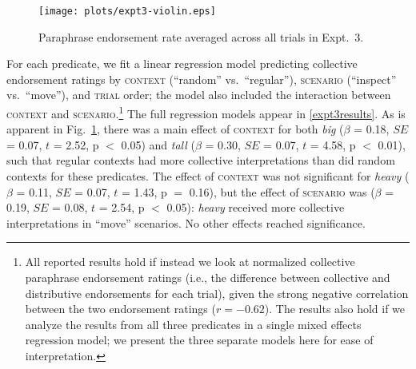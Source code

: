 \documentclass[preprint,12pt,authoryear,titlepage]{elsarticle}
\newcommand{\ndg}[1]{\textcolor{Green}{[ndg: #1]}}
\begin{document}

\begin{figure}[h!]
	\centering
	\texttt{[image: plots/expt3-violin.eps]} 
	\vspace{-20pt}
	\caption{Paraphrase endorsement rate averaged across all trials in Expt.~3.}\label{resultsexpt2}
\end{figure}

For each predicate, we fit a linear regression model predicting collective endorsement ratings by \textsc{context} (``random'' vs.~``regular''),
\textsc{scenario} (``inspect'' vs.~``move''), and \textsc{trial} order; the model also included the interaction between \textsc{context} and \textsc{scenario}.\footnote{All reported results hold if instead we look at normalized collective paraphrase endorsement ratings (i.e., the difference between collective and distributive endorsements for each trial), given the strong negative correlation between the two endorsement ratings ($r=-0.62$). The results also hold if we analyze the results from all three predicates in a single mixed effects regression model; we present the three separate models here for ease of interpretation.} The full regression models appear in \ref{expt3results}.
As is apparent in Fig.~\ref{resultsexpt2}, there was a main effect of \textsc{context} for both \emph{big} ($\beta$ = 0.18, $SE$ = 0.07, $t$ = 2.52, p $<$ 0.05) and \emph{tall} ($\beta$ = 0.30, $SE$ = 0.07, $t$ = 4.58, p $<$ 0.01), such that regular contexts had more collective interpretations than did random contexts for these predicates. The effect of \textsc{context} was not significant for \emph{heavy} ($\beta$ = 0.11, $SE$ = 0.07, $t$ = 1.43, p $=$ 0.16), but the effect of \textsc{scenario} was ($\beta$ = 0.19, $SE$ = 0.08, $t$ = 2.54, p $<$ 0.05): \emph{heavy} received more collective interpretations in ``move'' scenarios. No other effects reached significance.

\end{document}

